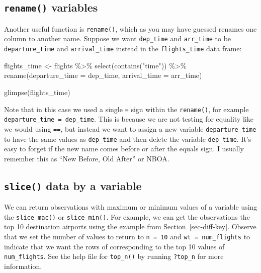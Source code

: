 \documentclass[
  letterpaper,
  DIV=11,
  numbers=noendperiod]{scrreprt}
\newenvironment{Shaded}{\begin{snugshade}}{\end{snugshade}}
\newcommand{\AttributeTok}[1]{\textcolor[rgb]{0.40,0.45,0.13}{#1}}
\newcommand{\FunctionTok}[1]{\textcolor[rgb]{0.28,0.35,0.67}{#1}}
\newcommand{\NormalTok}[1]{\textcolor[rgb]{0.00,0.23,0.31}{#1}}
\newcommand{\OtherTok}[1]{\textcolor[rgb]{0.00,0.23,0.31}{#1}}
\newcommand{\SpecialCharTok}[1]{\textcolor[rgb]{0.37,0.37,0.37}{#1}}
\newcommand{\StringTok}[1]{\textcolor[rgb]{0.13,0.47,0.30}{#1}}
\theoremstyle{definition}
\theoremstyle{remark}
\begin{document}
\hypertarget{sec-rename}{%
\subsection{\texorpdfstring{\texttt{rename()}
variables}{rename() variables}}\label{sec-rename}}

Another useful function is \texttt{rename()}, which as you may have
guessed renames one column to another name. Suppose we want
\texttt{dep\_time} and \texttt{arr\_time} to be \texttt{departure\_time}
and \texttt{arrival\_time} instead in the \texttt{flights\_time} data
frame:

\begin{Shaded}
\begin{Highlighting}[]
\NormalTok{flights\_time }\OtherTok{\textless{}{-}}\NormalTok{ flights }\SpecialCharTok{\%\textgreater{}\%} 
  \FunctionTok{select}\NormalTok{(}\FunctionTok{contains}\NormalTok{(}\StringTok{"time"}\NormalTok{)) }\SpecialCharTok{\%\textgreater{}\%} 
  \FunctionTok{rename}\NormalTok{(}\AttributeTok{departure\_time =}\NormalTok{ dep\_time,}
         \AttributeTok{arrival\_time =}\NormalTok{ arr\_time)}

\FunctionTok{glimpse}\NormalTok{(flights\_time)}
\end{Highlighting}
\end{Shaded}

Note that in this case we used a single \texttt{=} sign within the
\texttt{rename()}, for example \texttt{departure\_time\ =\ dep\_time}.
This is because we are not testing for equality like we would using
\texttt{==}, but instead we want to assign a new variable
\texttt{departure\_time} to have the same values as \texttt{dep\_time}
and then delete the variable \texttt{dep\_time}. It's easy to forget if
the new name comes before or after the equals sign. I usually remember
this as ``New Before, Old After'' or NBOA.

\hypertarget{slice-data-by-a-variable}{%
\subsection{\texorpdfstring{\texttt{slice()} data by a
variable}{slice() data by a variable}}\label{slice-data-by-a-variable}}

We can return observations with maximum or minimum values of a variable
using the \texttt{slice\_mac()} or \texttt{slice\_min()}. For example,
we can get the observations the top 10 destination airports using the
example from Section~\ref{sec-diff-key}. Observe that we set the number
of values to return to \texttt{n\ =\ 10} and
\texttt{wt\ =\ num\_flights} to indicate that we want the rows of
corresponding to the top 10 values of \texttt{num\_flights}. See the
help file for \texttt{top\_n()} by running \texttt{?top\_n} for more
information.
\end{document}
